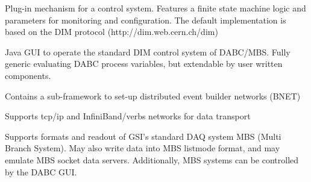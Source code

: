 \item Plug-in mechanism for a control system. Features a finite state machine
   logic and parameters for monitoring and  configuration.
   The default implementation is based
   on the DIM protocol (http://dim.web.cern.ch/dim)

\item Java GUI to operate the standard DIM control system of DABC/MBS. 
   Fully generic evaluating DABC process variables, but extendable
   by user written components.

\item Contains a sub-framework to set-up distributed event builder networks (BNET) 
 
\item Supports tcp/ip and InfiniBand/verbs networks for data transport

\item Supports formats and readout of GSI's standard DAQ system MBS
   (Multi Branch System). May also write data into MBS listmode format,
   and may emulate MBS socket data servers.
   Additionally, MBS systems can be controlled by the DABC GUI.  
\enum

% 
% 
% 


